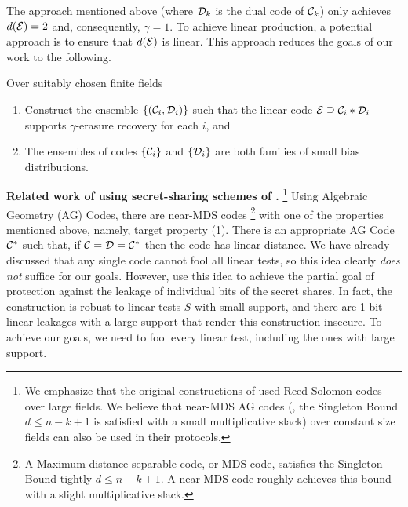 
The approach mentioned above (where ${\mathcal D}_k$ is the dual code of ${\mathcal C}_k$) only achieves $d({\mathcal E})=2$ and, consequently, $\gamma=1$. 
To achieve linear production, a potential approach is to ensure that $d({\mathcal E})$ is linear.
%
This approach reduces the goals of our work to the following. 
\begin{boxedalgo}
	Over suitably chosen finite fields
	\begin{enumerate}
		\item Construct the ensemble $\{({\mathcal C}_i,{\mathcal D}_i)\}$ such that the linear code ${\mathcal E}\supseteq {\mathcal C}_i*{\mathcal D}_i$ supports $\gamma$-erasure recovery for each $i$, and 
		\item The ensembles of codes $\{{\mathcal C}_i\}$ and $\{{\mathcal D}_i\}$ are both families of small bias distributions. 
	\end{enumerate}
\end{boxedalgo} 




\noindent\textbf{Related work of \cite{TCC:MeiPrzWul07,ICALP:PrzWul08} using secret-sharing schemes of \cite{C:CheCra06}.}%
\footnote{
	We emphasize that the original constructions of \cite{TCC:MeiPrzWul07,ICALP:PrzWul08} used Reed-Solomon codes over large fields. 
	We believe that near-MDS AG codes (\ie, the Singleton Bound $d\leq n-k+1$ is satisfied with a small multiplicative slack) over constant size fields can also be used in their protocols.  
} 
Using Algebraic Geometry (AG) Codes, there are near-MDS codes%
\footnote{
	A Maximum distance separable code, or MDS code, satisfies the Singleton Bound tightly $d\leq n-k+1$. 
	A near-MDS code roughly achieves this bound with a slight multiplicative slack. 
}
with one of the properties mentioned above, namely, target property (1). 
There is an appropriate AG Code ${\mathcal C}^*$ such that, if ${\mathcal C}={\mathcal D}={\mathcal C}^*$ then the code \cE has linear distance. 
We have already discussed that any single code cannot fool all linear tests, so this idea clearly {\em does not} suffice for our goals. 
However, \cite{TCC:MeiPrzWul07,ICALP:PrzWul08} use this idea to achieve the partial goal of protection against the leakage of individual bits of the secret shares. 
In fact, the construction is robust to linear tests $S$ with small support, and there are 1-bit linear leakages with a large support that render this construction insecure. 
To achieve our goals, {we need to fool every linear test}, including the ones with large support.  %
\\

